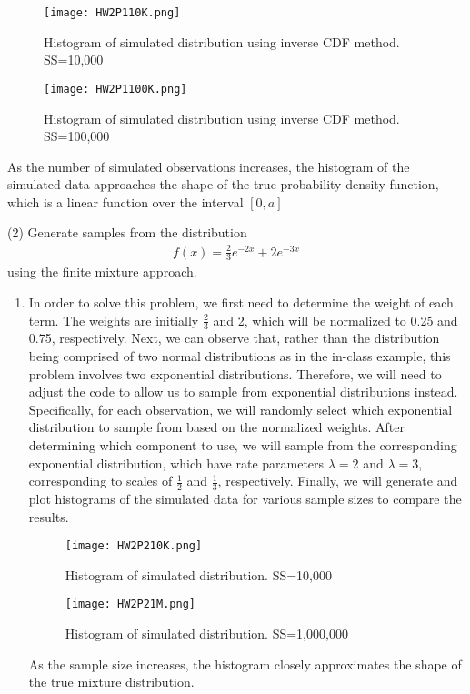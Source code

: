 \documentclass[final,11pt]{article}
\begin{document}
\begin{spacing}{1.25}
\begin{enumerate}
    \begin{figure}[h]
        \centering
        \texttt{[image: HW2P110K.png]}
        \caption{Histogram of simulated distribution using inverse CDF method. SS=10,000}
        \label{fig:SS10000}
    \end{figure}
    \FloatBarrier
    \begin{figure}[h]
        \centering
        \texttt{[image: HW2P1100K.png]}
        \caption{Histogram of simulated distribution using inverse CDF method. SS=100,000}
        \label{fig:SS10000}
    \end{figure}
    As the number of simulated observations increases, the histogram of the simulated data approaches the shape of the true probability density function, which is a linear function over the interval $[0,a]$
\end{enumerate}
\newpage

(2) Generate samples from the distribution
\begin{gather}
    f(x)=\frac{2}{3}e^{-2x}+2e^{-3x}
\end{gather}
using the finite mixture approach.
\begin{enumerate}
    \item In order to solve this problem, we first need to determine the weight of each term. The weights are initially \( \frac{2}{3} \) and 2, which will be normalized to 0.25 and 0.75, respectively. Next, we can observe that, rather than the distribution being comprised of two normal distributions as in the in-class example, this problem involves two exponential distributions. Therefore, we will need to adjust the code to allow us to sample from exponential distributions instead. Specifically, for each observation, we will randomly select which exponential distribution to sample from based on the normalized weights. After determining which component to use, we will sample from the corresponding exponential distribution, which have rate parameters \( \lambda = 2 \) and \( \lambda = 3 \), corresponding to scales of \( \frac{1}{2} \) and \( \frac{1}{3} \), respectively. Finally, we will generate and plot histograms of the simulated data for various sample sizes to compare the results.
    \FloatBarrier
    \begin{figure}[h]
        \centering
        \texttt{[image: HW2P210K.png]}
        \caption{Histogram of simulated distribution. SS=10,000}
        \label{fig:SS10000}
    \end{figure}
    \FloatBarrier
    \begin{figure}[h]
        \centering
        \texttt{[image: HW2P21M.png]}
        \caption{Histogram of simulated distribution. SS=1,000,000}
        \label{fig:SS1000000}
    \end{figure}
    \FloatBarrier
    As the sample size increases, the histogram closely approximates the shape of the true mixture distribution.
\end{enumerate}
\newpage


\end{spacing}
\end{document}
